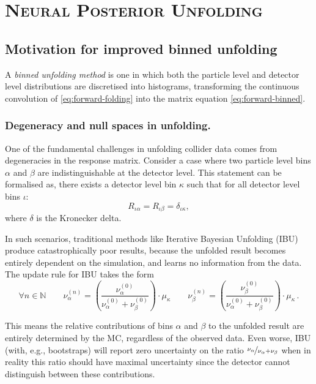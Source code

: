 \chapter{\textsc{Neural Posterior Unfolding}}
\label{chap:npu}
\chapterminitoc
\section{Motivation for improved binned unfolding}
\sectionminitoc

\begin{definition}
    A \emph{binned unfolding method} is one in which both the particle level and detector level distributions are discretised into histograms, transforming the continuous convolution of \cref{eq:forward-folding} into the matrix equation \cref{eq:forward-binned}.
\end{definition}

\subsection{Degeneracy and null spaces in unfolding.}
    One of the fundamental challenges in unfolding collider data comes from degeneracies in the response matrix.
    Consider a case where two particle level bins $\alpha$ and $\beta$ are indistinguishable at the detector level.
    This statement can be formalised as, there exists a detector level bin $\kappa$ such that for all detector level bins $\iota$:
    \begin{equation}
        R_{\iota\alpha} = R_{\iota\beta} = \delta_{\iota\kappa},
    \end{equation}
    where $\delta$ is the Kronecker delta.
    
    In such scenarios, traditional methods like Iterative Bayesian Unfolding (IBU) produce catastrophically poor results, because the unfolded result becomes entirely dependent on the simulation, and learns no information from the data.
    The update rule for IBU takes the form
    \begin{equation}
        \forall n \in \mathbb{N}
        \qquad
        \nu_{\alpha}^{(n)} = \left(\frac{\nu_\alpha^{(0)}}{\nu_\alpha^{(0)} + \nu_{\beta}^{(0)}}\right) \cdot \mu_\kappa
        \qquad
        \nu_{\beta}^{(n)} = \left(\frac{\nu_\beta^{(0)}}{\nu_\alpha^{(0)} + \nu_{\beta}^{(0)}}\right) \cdot \mu_\kappa\,.
    \end{equation}

    This means the relative contributions of bins $\alpha$ and $\beta$ to the unfolded result are entirely determined by the MC, regardless of the observed data.
    Even worse, IBU (with, e.g., bootstraps) will report zero uncertainty on the ratio \(\nicefrac{\nu_\alpha}{\nu_\alpha+\nu_\beta}\) when in reality this ratio should have maximal uncertainty since the detector cannot distinguish between these contributions.
